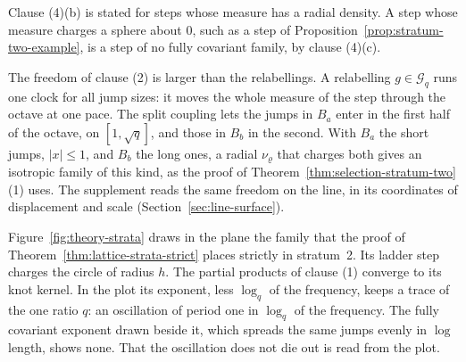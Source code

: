 Clause (4)(b) is stated for steps whose \Levy{} measure has a radial density. A step whose \Levy{}
measure charges a sphere about $0$, such as a step of Proposition~\ref{prop:stratum-two-example},
is a step of no fully covariant family, by clause (4)(c).

The freedom of clause (2) is larger than the relabellings. A relabelling
$g \in \mathcal{G}_q$ runs one clock for all jump sizes: it moves the whole \Levy{} measure of the
step through the octave at one pace. The split coupling lets the jumps in $B_a$ enter in the first
half of the octave, on $[1, \sqrt q]$, and those in $B_b$ in the second. With $B_a$ the short jumps,
$|x| \le 1$, and $B_b$ the long ones, a radial $\nu_\varrho$ that charges both gives an isotropic
family of this kind, as the proof of Theorem~\ref{thm:selection-stratum-two}(1) uses. The supplement reads the same freedom on the
line, in its coordinates of displacement and scale (Section~\ref{sec:line-surface}).

Figure~\ref{fig:theory-strata} draws in the plane the family that the proof of
Theorem~\ref{thm:lattice-strata-strict} places strictly in stratum~2. Its ladder step charges the
circle of radius $h$. The partial products of clause (1) converge to its knot kernel. In the plot
its exponent, less $\log_q$ of the frequency, keeps a trace of the one ratio $q$: an oscillation of
period one in $\log_q$ of the frequency. The fully covariant exponent drawn beside it, which spreads
the same jumps evenly in $\log$ length, shows none. That the oscillation does not die out is read
from the plot.

